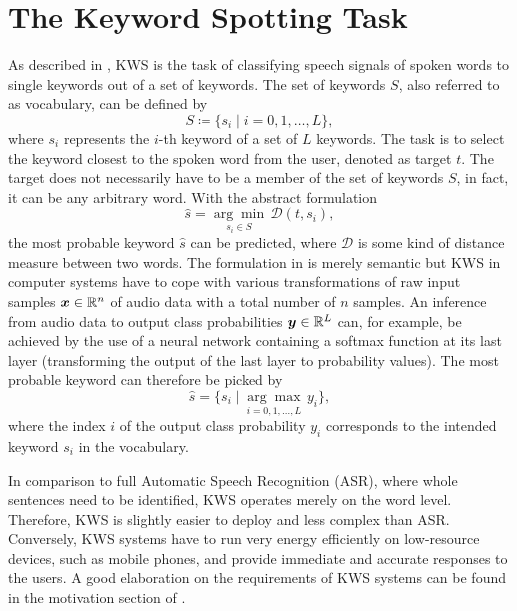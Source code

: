 
\section{The Keyword Spotting Task}\label{sec:intro_kws}
As described in , KWS is the task of classifying speech signals of spoken words to single keywords out of a set of keywords.
The set of keywords $S$, also referred to as vocabulary, can be defined by
\begin{equation}\label{eq:intro_kws_dict}
	S \coloneqq \{s_i \mid i = 0, 1, \dots, L\},
\end{equation}
where $s_i$ represents the $i$-th keyword of a set of $L$ keywords.
The task is to select the keyword closest to the spoken word from the user, denoted as target $t$.
The target does not necessarily have to be a member of the set of keywords $S$, in fact, it can be any arbitrary word.
With the abstract formulation
\begin{equation}\label{eq:intro_kws_task}
	\hat{s} = \underset{s_i \in S}{\arg \min} \, \mathcal{D}(t, s_i),
\end{equation}
the most probable keyword $\hat{s}$ can be predicted, where $\mathcal{D}$ is some kind of distance measure between two words.
The formulation in  is merely semantic but KWS in computer systems have to cope with various transformations of raw input samples $\bm{x} \in \mathbb{R}^n$ of audio data with a total number of $n$ samples.
An inference from audio data to output class probabilities $\bm{y} \in \mathbb{R}^L$ can, for example, be achieved by the use of a neural network containing a softmax function at its last layer (transforming the output of the last layer to probability values).
The most probable keyword can therefore be picked by
\begin{equation}\label{eq:intro_kws_class}
	\hat{s} = \{s_i \mid \underset{i = 0, 1, \dots, L}{\arg \max} \, y_i\},
\end{equation}
where the index $i$ of the output class probability $y_i$ corresponds to the intended keyword $s_i$ in the vocabulary.

In comparison to full Automatic Speech Recognition (ASR), where whole sentences need to be identified, KWS operates merely on the word level.
Therefore, KWS is slightly easier to deploy and less complex than ASR.
Conversely, KWS systems have to run very energy efficiently on low-resource devices, such as mobile phones, and provide immediate and accurate responses to the users.
A good elaboration on the requirements of KWS systems can be found in the motivation section of \cite{Warden2018}.